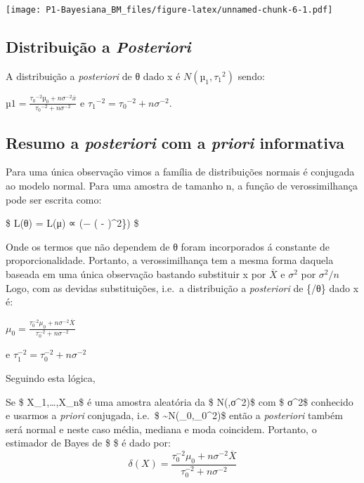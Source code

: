 \documentclass[
]{article}
\begin{document}
\texttt{[image: P1-Bayesiana\_BM\_files/figure-latex/unnamed-chunk-6-1.pdf]}

\hypertarget{distribuiuxe7uxe3o-a-posteriori}{%
\subsection{\texorpdfstring{Distribuição a
\emph{Posteriori}}{Distribuição a Posteriori}}\label{distribuiuxe7uxe3o-a-posteriori}}

A distribuição a \emph{posteriori} de θ dado x é \(N(µ_1, {τ_1}^2)\)
sendo:

\(µ1 = {\frac{{τ_0}^{−2}µ_0 + nσ^{−2}\overline{x}}{{τ_0}^{−2}+ nσ^{−2}}}\)
e \({τ_1}^{−2} = {τ_0}^{-2} + nσ^{−2}.\)

\hypertarget{resumo-a-posteriori-com-a-priori-informativa}{%
\subsection{\texorpdfstring{Resumo a \emph{posteriori} com a
\emph{priori}
informativa}{Resumo a posteriori com a priori informativa}}\label{resumo-a-posteriori-com-a-priori-informativa}}

Para uma única observação vimos a família de distribuições normais é
conjugada ao modelo normal. Para uma amostra de tamanho n, a função de
verossimilhança pode ser escrita como:

\$ L(θ) = L(μ) ∝ \exp (− ( - \theta)\^{}2\})
\$

Onde os termos que não dependem de θ foram incorporados á constante de
proporcionalidade. Portanto, a verossimilhança tem a mesma forma daquela
baseada em uma única observação bastando substituir x por
\({\overline{X}}\) e \(σ^2\) por \(σ^2/n\) Logo, com as devidas
substituições, i.e.~a distribuição a \emph{posteriori} de \{/θ\} dado x
é:

\(μ_0=\frac{\tau_0^{-2}\mu_0+nσ^{-2}{\overline{X}}}{\tau_0^{-2}+nσ^{-2}}\)

e \(\tau_1^{-2}=\tau_0^{-2}+nσ^{-2}\)

Seguindo esta lógica,

Se \$ X\_1,\dots,X\_n\$ é uma amostra aleatória da \$ N(\theta,σ\^{}2)\$
com \$ σ\^{}2\$ conhecido e usarmos a \emph{priori} conjugada, i.e.~\$
\theta\sim N(\mu\_0,\tau\_0\^{}2)\$ então a \emph{posteriori} também
será normal e neste caso média, mediana e moda coincidem. Portanto, o
estimador de Bayes de \$ \theta\$ é dado por:
\[\displaystyle \delta(X)=\frac{\tau_0^{-2}\mu_0+nσ^{-2}{\overline{X}}}{\tau_0^{-2}+nσ^{-2}}\]
\end{document}
